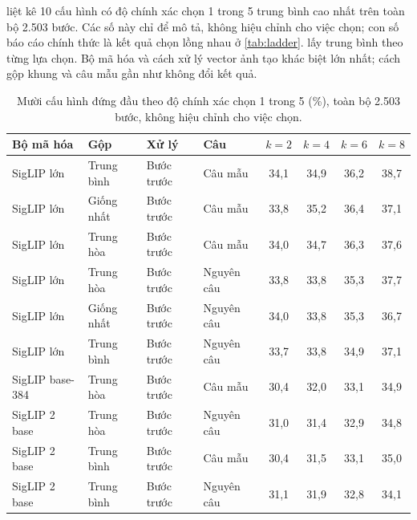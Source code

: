 \documentclass[a4paper,oneside]{report}
\begin{document}
 liệt kê 10 cấu hình có độ chính xác chọn 1 trong 5 trung bình cao nhất trên toàn bộ 2.503 bước. Các số này chỉ để mô tả, không hiệu chỉnh cho việc chọn; con số báo cáo chính thức là kết quả chọn lồng nhau ở \cref{tab:ladder}.  lấy trung bình theo từng lựa chọn. Bộ mã hóa và cách xử lý vector ảnh tạo khác biệt lớn nhất; cách gộp khung và câu mẫu gần như không đổi kết quả.

\begin{table}[ht]
\centering
\caption{Mười cấu hình đứng đầu theo độ chính xác chọn 1 trong 5 (\%), toàn bộ 2.503 bước, không hiệu chỉnh cho việc chọn.}
\label{tab:grid_top}
\small
\begin{tabular}{llllcccc}
\toprule
Bộ mã hóa & Gộp & Xử lý & Câu & $k=2$ & $k=4$ & $k=6$ & $k=8$ \\
\midrule
SigLIP lớn & Trung bình & Bước trước & Câu mẫu & 34,1 & 34,9 & 36,2 & 38,7 \\
SigLIP lớn & Giống nhất & Bước trước & Câu mẫu & 33,8 & 35,2 & 36,4 & 37,1 \\
SigLIP lớn & Trung hòa & Bước trước & Câu mẫu & 34,0 & 34,7 & 36,3 & 37,6 \\
SigLIP lớn & Trung hòa & Bước trước & Nguyên câu & 33,8 & 33,8 & 35,3 & 37,7 \\
SigLIP lớn & Giống nhất & Bước trước & Nguyên câu & 34,0 & 33,8 & 35,3 & 36,7 \\
SigLIP lớn & Trung bình & Bước trước & Nguyên câu & 33,7 & 33,8 & 34,9 & 37,1 \\
SigLIP base-384 & Trung hòa & Bước trước & Câu mẫu & 30,4 & 32,0 & 33,1 & 34,9 \\
SigLIP 2 base & Trung hòa & Bước trước & Nguyên câu & 31,0 & 31,4 & 32,9 & 34,8 \\
SigLIP 2 base & Trung bình & Bước trước & Câu mẫu & 30,4 & 31,5 & 33,1 & 35,0 \\
SigLIP 2 base & Trung bình & Bước trước & Nguyên câu & 31,1 & 31,9 & 32,8 & 34,1 \\
\bottomrule
\end{tabular}
\end{table}
\end{document}
